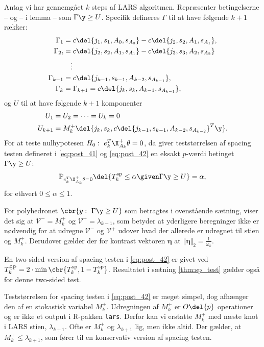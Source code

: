 %
\begin{thm} \label{thm:sp_test}
Antag vi har gennemgået \(k\) steps af LARS algoritmen.
Repræsenter betingelserne -- og -- i lemma -- som \(\Gamma \y \geq U\).
Specifik defineres \(\Gamma\) til at have følgende \(k + 1 \) rækker:
\begin{align*}
\Gamma_1 &= c \del{j_1, s_1, A_0, s_{A_0}} - c \del{j_2, s_2, A_1, s_{A_1}}, \\
\Gamma_2, &= c \del{j_2, s_2, A_1, s_{A_1}} - c \del{j_3, s_3, A_2, s_{A_2}} \\
& \quad \vdots \\
\Gamma_{k-1} &= c \del{j_{k-1}, s_{k-1}, A_{k-2}, s_{A_{k-1}}}, \\
 \Gamma_k &= \Gamma_{k+1} = c \del{j_k, s_k, A_{k-1}, s_{A_{k-1}}},
\end{align*}
og \(U\) til at have følgende \(k+1\) komponenter
\begin{align*}
U_1 &= U_2 = \dots = U_k = 0 \\
U_{k+1} &= M_k^+ \del{j_k, s_k, c \del{j_{k-1}, s _{k-1}, A_{k-2}, s_{A_{k-2}}}^T \y}.
\end{align*}
For at teste nulhypotesen \(H_0: \ e_k^T \X_{A_k}^+ \theta = 0\), da giver teststørrelsen af spacing testen defineret i \eqref{eq:post_41} og \eqref{eq:post_42} en eksakt \(p\)-værdi betinget \(\Gamma \y \geq U\):
\begin{align*}
\mathbb{P}_{e_k^T \X_{A_k}^+ \theta = 0} \del{T_k^\text{sp} \leq \alpha \given \Gamma \y \geq U} = \alpha,
\end{align*}
for ethvert \(0 \leq \alpha \leq 1\).
\end{thm}
%
For polyhedronet \(\cbr{y: \ \Gamma \y \geq U}\) som betragtes i ovenstående sætning, viser det sig at \(\mathcal{V}^- = M_k^+\) og \(\mathcal{V}^+=\lambda_{k-1}\), som betyder at yderligere beregninger ikke er nødvendig for at udregne \(\mathcal{V}^-\) og \(\mathcal{V}^+\) udover hvad der allerede er udregnet til stien og \(M_k^+\).
Derudover gælder der for kontrast vektoren \(\boldsymbol{\eta}\) at \(\Vert \boldsymbol{\eta} \Vert_2 = \frac{1}{\omega_k}\).

En two-sided version af spacing testen i \eqref{eq:post_42} er givet ved \(T_k^\text{SP} = 2 \cdot \min \cbr{T_k^\text{sp}, 1 - T_k^\text{sp}}\).
Resultatet i sætning \ref{thm:sp_test} gælder også for denne two-sided test.

Teststørrelsen for spacing testen i \eqref{eq:post_42} er meget simpel, dog afhænger den af en stokastisk variabel \(M_k^+\).
Udregningen af \(M_k^+\) er \(O\del{p}\) operationer og er ikke et output i R-pakken \texttt{lars}.
Derfor kan vi erstatte \(M_k^+\) med næste knot i LARS stien, \(\lambda_{k+1}\).
Ofte er \(M_k^+\) og \(\lambda_{k+1}\) lig, men ikke altid.
Der gælder, at \(M_k^+ \leq \lambda_{k+1}\), som fører til en konservativ version af spacing testen.

